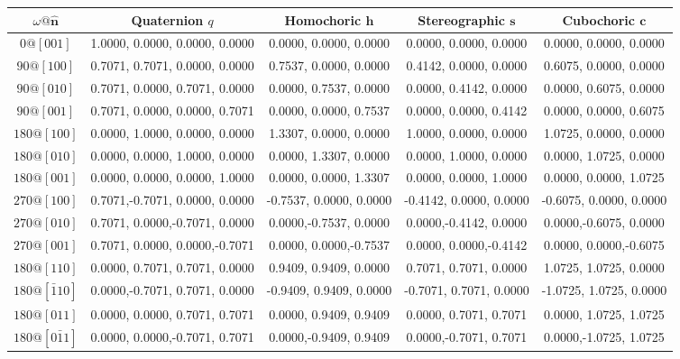 \begin{table}[h!]
\centering\leavevmode
\begin{warpHTML}
\begin{tabular}{ccccc}
\hline
$\omega@\hat{\mathbf{n}}$ & Quaternion $q$ & Homochoric $\mathbf{h}$ & Stereographic $\mathbf{s}$ & Cubochoric $\mathbf{c}$ \\
\hline\hline
$0@[001]$ &  1.0000, 0.0000, 0.0000, 0.0000 & 0.0000, 0.0000, 0.0000 & 0.0000, 0.0000, 0.0000 & 0.0000, 0.0000, 0.0000 \\
$90@[100]$ &  0.7071, 0.7071, 0.0000, 0.0000 &  0.7537, 0.0000, 0.0000 &  0.4142, 0.0000, 0.0000 &  0.6075, 0.0000, 0.0000 \\ 
$90@[010]$ &  0.7071, 0.0000, 0.7071, 0.0000 &  0.0000, 0.7537, 0.0000 &  0.0000, 0.4142, 0.0000 &  0.0000, 0.6075, 0.0000 \\
$90@[001]$ &  0.7071, 0.0000, 0.0000, 0.7071 &  0.0000, 0.0000, 0.7537 &  0.0000, 0.0000, 0.4142 &  0.0000, 0.0000, 0.6075 \\
$180@[100]$ &  0.0000, 1.0000, 0.0000, 0.0000 &  1.3307, 0.0000, 0.0000 &  1.0000, 0.0000, 0.0000 &  1.0725, 0.0000, 0.0000 \\
$180@[010]$ &  0.0000, 0.0000, 1.0000, 0.0000 &  0.0000, 1.3307, 0.0000 &  0.0000, 1.0000, 0.0000 &  0.0000, 1.0725, 0.0000 \\ 
$180@[001]$ &  0.0000, 0.0000, 0.0000, 1.0000 &  0.0000, 0.0000, 1.3307 &  0.0000, 0.0000, 1.0000 &  0.0000, 0.0000, 1.0725 \\ 
$270@[100]$ &  0.7071,-0.7071, 0.0000, 0.0000 & -0.7537, 0.0000, 0.0000 & -0.4142, 0.0000, 0.0000 & -0.6075, 0.0000, 0.0000 \\
$270@[010]$ &  0.7071, 0.0000,-0.7071, 0.0000 &  0.0000,-0.7537, 0.0000 &  0.0000,-0.4142, 0.0000 &  0.0000,-0.6075, 0.0000 \\
$270@[001]$ &  0.7071, 0.0000, 0.0000,-0.7071 &  0.0000, 0.0000,-0.7537 &  0.0000, 0.0000,-0.4142 &  0.0000, 0.0000,-0.6075 \\
\hline
$180@[110]$ &  0.0000, 0.7071, 0.7071, 0.0000 &  0.9409, 0.9409, 0.0000 &  0.7071, 0.7071, 0.0000 &  1.0725, 1.0725, 0.0000 \\ 
$180@[\bar{1}10]$ &  0.0000,-0.7071, 0.7071, 0.0000 & -0.9409, 0.9409, 0.0000 & -0.7071, 0.7071, 0.0000 & -1.0725, 1.0725, 0.0000 \\
$180@[011]$ &  0.0000, 0.0000, 0.7071, 0.7071 &  0.0000, 0.9409, 0.9409 &  0.0000, 0.7071, 0.7071 &  0.0000, 1.0725, 1.0725 \\
$180@[0\bar{1}1]$ &  0.0000, 0.0000,-0.7071, 0.7071 &  0.0000,-0.9409, 0.9409 &  0.0000,-0.7071, 0.7071 &  0.0000,-1.0725, 1.0725 \\

\end{tabular}
\end{warpHTML}
\end{table}
